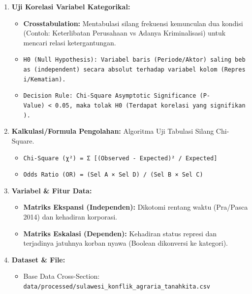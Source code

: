 \documentclass[
]{article}
\providecommand{\tightlist}{%
  \setlength{\itemsep}{0pt}\setlength{\parskip}{0pt}}
\begin{document}
\begin{enumerate}
\def\labelenumi{\arabic{enumi}.}
\tightlist
\item
  \textbf{Uji Korelasi Variabel Kategorikal:}

  \begin{itemize}
  \tightlist
  \item
    \textbf{Crosstabulation:} Mentabulasi silang frekuensi kemunculan
    dua kondisi (Contoh: Keterlibatan Perusahaan vs Adanya
    Kriminalisasi) untuk mencari relasi ketergantungan.
  \item
    \texttt{H0\ (Null\ Hypothesis):\ Variabel\ baris\ (Periode/Aktor)\ saling\ bebas\ (independent)\ secara\ absolut\ terhadap\ variabel\ kolom\ (Represi/Kematian).}
  \item
    \texttt{Decision\ Rule:\ Chi-Square\ Asymptotic\ Significance\ (P-Value)\ \textless{}\ 0.05,\ maka\ tolak\ H0\ (Terdapat\ korelasi\ yang\ signifikan).}
  \end{itemize}
\item
  \textbf{Kalkulasi/Formula Pengolahan:} Algoritma Uji Tabulasi Silang
  Chi-Square.

  \begin{itemize}
  \tightlist
  \item
    \texttt{Chi-Square\ (χ²)\ =\ Σ\ {[}(Observed\ -\ Expected)²\ /\ Expected{]}}
  \item
    \texttt{Odds\ Ratio\ (OR)\ =\ (Sel\ A\ ×\ Sel\ D)\ /\ (Sel\ B\ ×\ Sel\ C)}
  \end{itemize}
\item
  \textbf{Variabel \& Fitur Data:}

  \begin{itemize}
  \tightlist
  \item
    \textbf{Matriks Ekspansi (Independen):} Dikotomi rentang waktu
    (Pra/Pasca 2014) dan kehadiran korporasi.
  \item
    \textbf{Matriks Eskalasi (Dependen):} Kehadiran status represi dan
    terjadinya jatuhnya korban nyawa (Boolean dikonversi ke kategori).
  \end{itemize}
\item
  \textbf{Dataset \& File:}

  \begin{itemize}
  \tightlist
  \item
    Base Data Cross-Section:
    \texttt{data/processed/sulawesi\_konflik\_agraria\_tanahkita.csv}
  \end{itemize}
\end{enumerate}
\end{document}
